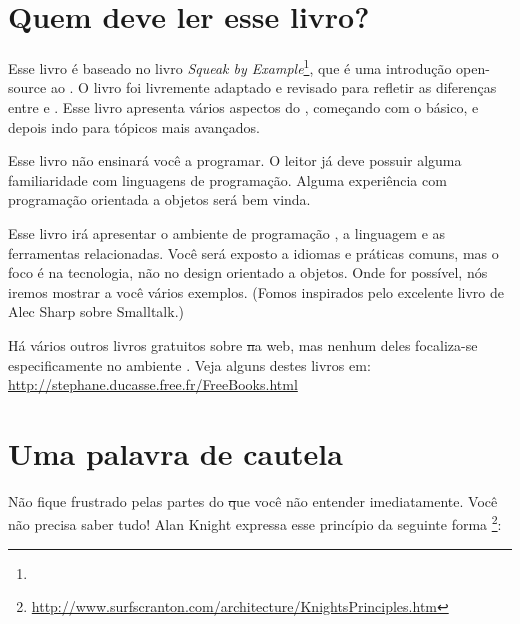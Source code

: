 \documentclass[a4paper,10pt,twoside]{book}
\begin{document}
\section*{Quem deve ler esse livro?}

Esse livro é baseado no livro \emph{Squeak by Example}\footnote{\sbe}, que é uma introdução open-source ao \squeak.
O livro foi livremente adaptado e revisado para refletir as diferenças entre \pharo e \squeak.
Esse livro apresenta vários aspectos do \pharo, começando com o básico, e depois indo para tópicos mais avançados.

Esse livro não ensinará você a programar. O leitor já deve possuir alguma familiaridade com linguagens de programação. Alguma experiência com programação orientada a objetos será bem vinda.

Esse livro irá apresentar o ambiente de programação \pharo, a linguagem e as ferramentas relacionadas.  Você será exposto a idiomas e práticas comuns, mas o foco é na tecnologia, não no design orientado a objetos. Onde for possível, nós iremos mostrar a você vários exemplos. (Fomos inspirados pelo excelente livro de Alec Sharp sobre Smalltalk\cite{Shar97a}.)

Há vários outros livros gratuitos sobre \st na web, mas nenhum deles focaliza-se especificamente no ambiente \pharo. Veja alguns destes livros em:
\url{http://stephane.ducasse.free.fr/FreeBooks.html}

\ifluluelse{}{\newpage} %
\section*{Uma palavra de cautela}


Não fique frustrado pelas partes do \st que você não entender imediatamente.
Você não precisa saber tudo!
Alan Knight expressa esse princípio da seguinte forma \footnote{\url{http://www.surfscranton.com/architecture/KnightsPrinciples.htm}}:
\end{document}
